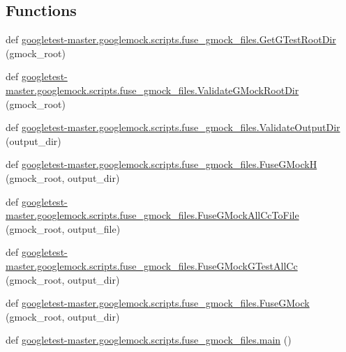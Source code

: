 \subsection*{Functions}
\begin{DoxyCompactItemize}
\item 
def \mbox{\hyperlink{namespacegoogletest-master_1_1googlemock_1_1scripts_1_1fuse__gmock__files_a6196633d1a12e459d39b773e94e8a3c3}{googletest-\/master.\+googlemock.\+scripts.\+fuse\+\_\+gmock\+\_\+files.\+Get\+G\+Test\+Root\+Dir}} (gmock\+\_\+root)
\item 
def \mbox{\hyperlink{namespacegoogletest-master_1_1googlemock_1_1scripts_1_1fuse__gmock__files_afb4cef28b860d8d84bbe885e454e25bb}{googletest-\/master.\+googlemock.\+scripts.\+fuse\+\_\+gmock\+\_\+files.\+Validate\+G\+Mock\+Root\+Dir}} (gmock\+\_\+root)
\item 
def \mbox{\hyperlink{namespacegoogletest-master_1_1googlemock_1_1scripts_1_1fuse__gmock__files_ac2ebd07cae9a27b8ad5f8bb42d390b4f}{googletest-\/master.\+googlemock.\+scripts.\+fuse\+\_\+gmock\+\_\+files.\+Validate\+Output\+Dir}} (output\+\_\+dir)
\item 
def \mbox{\hyperlink{namespacegoogletest-master_1_1googlemock_1_1scripts_1_1fuse__gmock__files_ab2fdeb0ebbbecafc12b2cbf5f7bab76b}{googletest-\/master.\+googlemock.\+scripts.\+fuse\+\_\+gmock\+\_\+files.\+Fuse\+G\+MockH}} (gmock\+\_\+root, output\+\_\+dir)
\item 
def \mbox{\hyperlink{namespacegoogletest-master_1_1googlemock_1_1scripts_1_1fuse__gmock__files_a91b76eda527214fd34d3460928f84f25}{googletest-\/master.\+googlemock.\+scripts.\+fuse\+\_\+gmock\+\_\+files.\+Fuse\+G\+Mock\+All\+Cc\+To\+File}} (gmock\+\_\+root, output\+\_\+file)
\item 
def \mbox{\hyperlink{namespacegoogletest-master_1_1googlemock_1_1scripts_1_1fuse__gmock__files_a2d81929d6195aba60e5eb5ce6096aad8}{googletest-\/master.\+googlemock.\+scripts.\+fuse\+\_\+gmock\+\_\+files.\+Fuse\+G\+Mock\+G\+Test\+All\+Cc}} (gmock\+\_\+root, output\+\_\+dir)
\item 
def \mbox{\hyperlink{namespacegoogletest-master_1_1googlemock_1_1scripts_1_1fuse__gmock__files_ae972465859b9db472bea086d82d870b8}{googletest-\/master.\+googlemock.\+scripts.\+fuse\+\_\+gmock\+\_\+files.\+Fuse\+G\+Mock}} (gmock\+\_\+root, output\+\_\+dir)
\item 
def \mbox{\hyperlink{namespacegoogletest-master_1_1googlemock_1_1scripts_1_1fuse__gmock__files_ab9913ac0cac64764121d9372344769c9}{googletest-\/master.\+googlemock.\+scripts.\+fuse\+\_\+gmock\+\_\+files.\+main}} ()
\end{DoxyCompactItemize}
